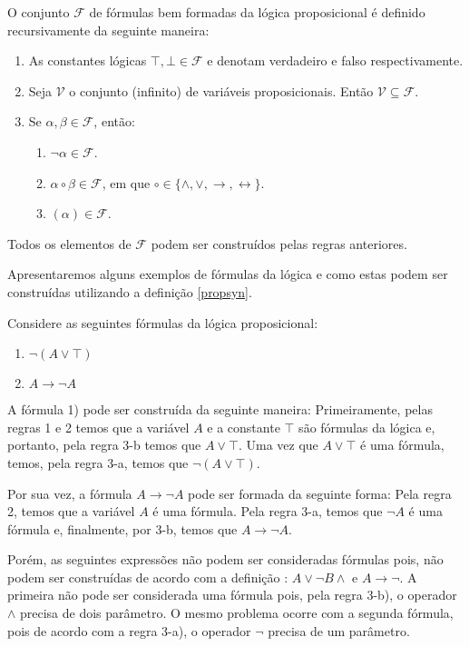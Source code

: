 \begin{Definition}\label{propsyn}
O conjunto $\mathcal{F}$ de f\'ormulas bem formadas da l\'ogica proposicional \'e definido recursivamente da seguinte maneira:
\begin{enumerate}
  \item As constantes l\'ogicas $\top,\bot \in \mathcal{F}$ e denotam verdadeiro e falso respectivamente.
  \item Seja $\mathcal{V}$ o conjunto (infinito) de vari\'aveis proposicionais. Ent\~ao $\mathcal{V} \subseteq \mathcal{F}$.
  \item Se $\alpha,\beta \in \mathcal{F}$, ent\~ao:
  \begin{enumerate}
    \item $\neg \alpha \in \mathcal{F}$.
    \item $\alpha \circ \beta \in \mathcal{F}$, em que $\circ \in \{\land,\lor,\to,\leftrightarrow\}$.
    \item $(\alpha)\in\mathcal{F}$.
  \end{enumerate}
\end{enumerate}
Todos os elementos de $\mathcal{F}$ podem ser constru\'idos pelas regras anteriores.
\end{Definition}
Apresentaremos alguns exemplos de f\'ormulas da l\'ogica e como estas
podem ser constru\'idas utilizando a defini\c{c}\~ao \ref{propsyn}.
\begin{Example}
Considere as seguintes fórmulas da lógica proposicional:
\begin{enumerate}
  \item $\neg (A \lor \top)$
  \item $A \to \neg A$
\end{enumerate}
A f\'ormula 1) pode ser constru\'ida da seguinte maneira:
Primeiramente, pelas regras 1 e 2 temos que a vari\'avel $A$ e a
constante $\top$ s\~ao f\'ormulas da lógica e, portanto, pela regra
3-b temos que $A \lor \top$. Uma vez que $A \lor \top$ \'e uma
f\'ormula, temos, pela regra 3-a, temos que $\neg (A \lor \top)$.

Por sua vez, a f\'ormula $A \to \neg A$ pode ser formada da seguinte
forma: Pela regra 2, temos que a vari\'avel $A$ \'e uma
f\'ormula. Pela regra 3-a, temos que $\neg A$ \'e uma f\'ormula e,
finalmente, por 3-b, temos que $A \to \neg A$.

Por\'em, as seguintes express\~oes n\~ao podem ser consideradas
f\'ormulas pois, n\~ao podem ser constru\'idas de acordo com a
defini\c{c}\~ao \label{propsyn}: $A \lor \neg B \land$ e $A \to
\neg$. A primeira n\~ao pode ser considerada uma f\'ormula pois,
pela regra 3-b), o operador $\land$ precisa de dois par\^ametro. O
mesmo problema ocorre com a segunda f\'ormula, pois de acordo com
a regra 3-a), o operador $\neg$ precisa de um par\^ametro.
\end{Example}

